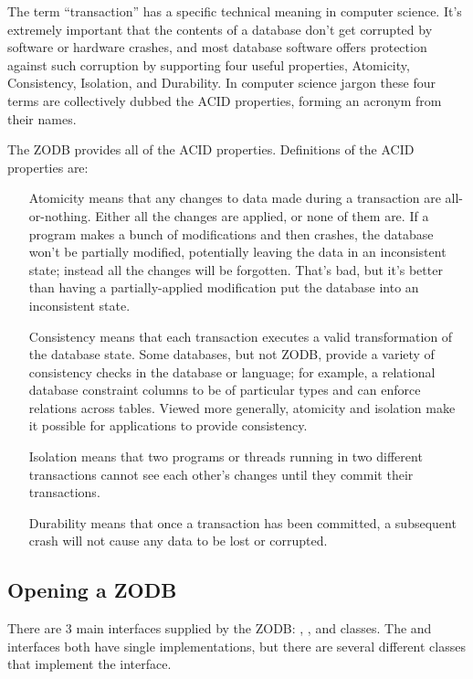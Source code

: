 The term ``transaction'' has a specific technical meaning in computer
science.  It's extremely important that the contents of a database
don't get corrupted by software or hardware crashes, and most database
software offers protection against such corruption by supporting four
useful properties, Atomicity, Consistency, Isolation, and Durability.
In computer science jargon these four terms are collectively dubbed
the ACID properties, forming an acronym from their names.  

The ZODB provides all of the ACID properties.  Definitions of the
ACID properties are:

\begin{itemize}

\item[Atomicity] means that any changes to data made during a transaction 
are all-or-nothing.  Either all the changes are applied, or none of
them are.  If a program makes a bunch of modifications and then
crashes, the database won't be partially modified, potentially leaving
the data in an inconsistent state; instead all the changes will be
forgotten.  That's bad, but it's better than having a
partially-applied modification put the database into an inconsistent
state.

\item[Consistency] means that each transaction executes a valid
transformation of the database state.  Some databases, but not ZODB,
provide a variety of consistency checks in the database or language;
for example, a relational database constraint columns to be of
particular types and can enforce relations across tables.  Viewed more
generally, atomicity and isolation make it possible for applications
to provide consistency.

\item[Isolation] means that two programs or threads running in two
 different transactions cannot see each other's changes until they
 commit their transactions.

\item[Durability] means that once a transaction has been committed,
a subsequent crash will not cause any data to be lost or corrupted.

\end{itemize}

\subsection{Opening a ZODB}

There are 3 main interfaces supplied by the ZODB:
, , and  classes. The
 and  interfaces both have single
implementations, but there are several different classes that
implement the  interface.

